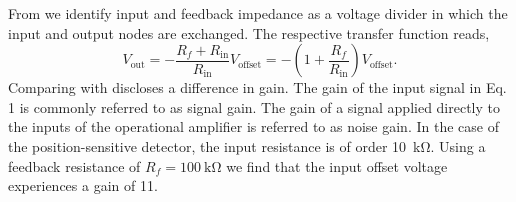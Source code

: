 From  we identify input and feedback impedance as a voltage divider in which the input and output nodes are exchanged.
The respective transfer function reads,
\begin{equation}
	V_\text{out}=-\frac{R_f+R_\text{in}}{R_\text{in}}V_\text{offset}=-\left(1+\frac{R_f}{R_\text{in}}\right)V_\text{offset}
	\label{eq:input_offset_voltage}.
\end{equation}
Comparing  with  discloses a difference in gain.
The gain of the input signal in Eq. 1 is commonly referred to as signal gain. 
The gain of a signal applied directly to the inputs of the operational amplifier is referred to as noise gain.
In the case of the position-sensitive detector, the input resistance is of order \SI{10}{\kilo\ohm}.
Using a feedback resistance of $R_f=\SI{100}{\kilo\ohm}$ we find that the input offset voltage experiences a gain of 11.

